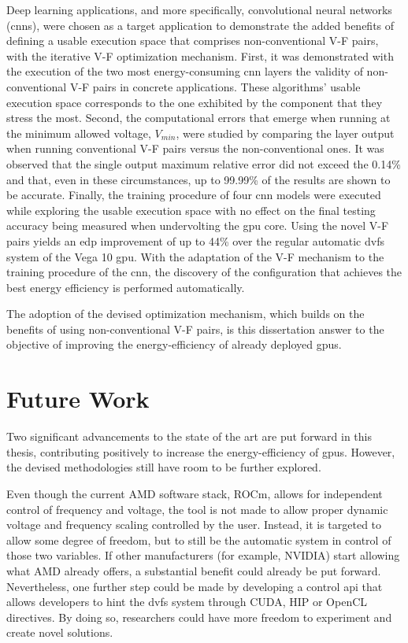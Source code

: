 Deep learning applications, and more specifically, convolutional neural networks (\acrshort{cnn}s), were chosen as a target application to demonstrate the added benefits of defining a usable execution space that comprises non-conventional V-F pairs, with the iterative V-F optimization mechanism.
First, it was demonstrated with the execution of the two most energy-consuming \acrshort{cnn} layers the validity of non-conventional V-F pairs in concrete applications. These algorithms' usable execution space corresponds to the one exhibited by the component that they stress the most. Second, the computational errors that emerge when running at the minimum allowed voltage, $V_{min}$, were studied by comparing the layer output when running conventional V-F pairs versus the non-conventional ones. It was observed that the single output maximum relative error did not exceed the 0.14\% and that, even in these circumstances, up to 99.99\% of the results are shown to be accurate. Finally, the training procedure of four \acrshort{cnn} models were executed while exploring the usable execution space with no effect on the final testing accuracy being measured when undervolting the \acrshort{gpu} core. Using the novel V-F pairs yields an \acrshort{edp} improvement of up to 44\% over the regular automatic  \acrshort{dvfs} system of the Vega 10  \acrshort{gpu}. 
With the adaptation of the V-F mechanism to the training procedure of the \acrshort{cnn}, the discovery of the configuration that achieves the best energy efficiency is performed automatically. 

The adoption of the devised optimization mechanism, which builds on the benefits of using non-conventional V-F pairs, is this dissertation answer to the objective of improving the energy-efficiency of already deployed \acrshort{gpu}s.






\section{Future Work}
\label{section:future}

Two significant advancements to the state of the art are put forward in this thesis, contributing positively to increase the energy-efficiency of \acrshort{gpu}s. However, the devised methodologies still have room to be further explored.

Even though the current AMD software stack, ROCm, allows for independent control of frequency and voltage, the tool is not made to allow proper dynamic voltage and frequency scaling controlled by the user. Instead, it is targeted to allow some degree of freedom, but to still be the automatic system in control of those two variables. If other manufacturers (for example, NVIDIA) start allowing what AMD already offers, a substantial benefit could already be put forward. Nevertheless, one further step could be made by developing a control \acrshort{api} that allows developers to hint the \acrshort{dvfs} system through CUDA, HIP or OpenCL directives. By doing so, researchers could have more freedom to experiment and create novel solutions.

